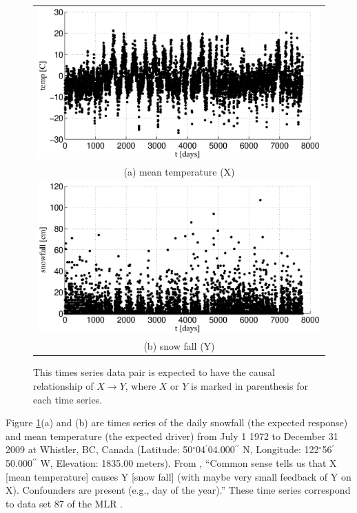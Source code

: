 \documentclass[twocolumn,aps,pre,groupedaddress]{revtex4-1}
\begin{document}
\begin{figure}[ht]
\begin{tabular}{c}
\includegraphics[scale=0.45]{EmpiricalData_p87X.eps} \\
(a) mean temperature (X) \\ 
\includegraphics[scale=0.45]{EmpiricalData_p87Y.eps} \\
(b) snow fall (Y) \\
\end{tabular}
\caption{This times series data pair is expected to have the causal relationship of $X\rightarrow Y$, where $X$ or $Y$ is marked in parenthesis for each time series.}
\label{fig:empdata}
\end{figure}
Figure \ref{fig:empdata}(a) and (b)  are times series of the daily snowfall (the expected response) and mean temperature (the expected driver) from July 1 1972 to December 31 2009 at Whistler, BC, Canada (Latitude: 50$^\circ$04$^\prime$04.000$^{\prime\prime}$ N, Longitude: 122$^\circ$56$^\prime$50.000$^{\prime\prime}$ W, Elevation: 1835.00 meters).  From \cite{bache2013}, ``Common sense tells us that X [mean temperature] causes Y [snow fall] (with maybe very small feedback of Y on X). Confounders are present (e.g., day of the year).''  These time series correspond to data set 87 of the MLR \cite{bache2013}.
\end{document}
